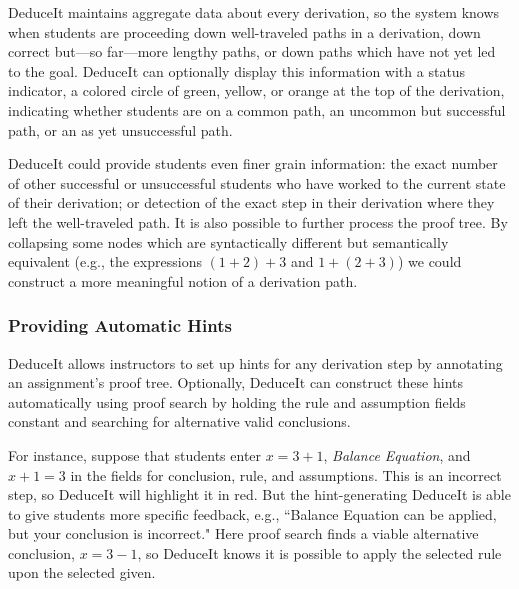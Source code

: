 \documentclass{sigchi}
\begin{document}
DeduceIt maintains aggregate data about every derivation, so the system knows when students are proceeding down well-traveled paths in a derivation, down correct but---so far---more lengthy paths, or down paths which have not yet led to the goal. DeduceIt can optionally display this information with a status indicator, a colored circle of green, yellow, or orange at the top of the derivation, indicating whether students are on a common path, an uncommon but successful path, or an as yet unsuccessful path. 

DeduceIt could provide students even finer grain information: the exact number of other successful or unsuccessful students who have worked to the current state of their derivation; or detection of the exact step in their derivation where they left the well-traveled path. It is also possible to further process the proof tree. By collapsing some nodes which are syntactically different but semantically equivalent (e.g., the expressions $(1+2)+3$ and $1+(2+3)$) we could construct a more meaningful notion of a derivation path. %

\subsubsection{Providing Automatic Hints}

DeduceIt allows instructors to set up hints for any derivation step by annotating an assignment's proof tree. Optionally, DeduceIt can construct these hints automatically using proof search by holding the rule and assumption fields constant and searching for alternative valid conclusions.

For instance, suppose that students enter $x=3+1$, \textit{Balance Equation}, and $x+1=3$ in the fields for conclusion, rule, and assumptions. This is an incorrect step, so DeduceIt will highlight it in red. But the hint-generating DeduceIt is able to give students more specific feedback, e.g., ``Balance Equation can be applied, but your conclusion is incorrect." Here proof search finds a viable alternative conclusion, $x=3-1$, so DeduceIt knows it is possible to apply the selected rule upon the selected given.
\end{document}
